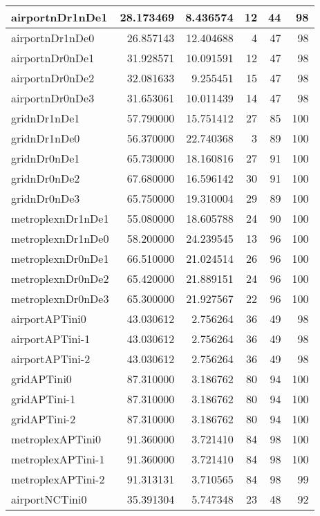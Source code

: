 \begin{longtable}{|l|r|r|r|r|r|}
\endlastfoot
airportnDr1nDe1 & 28.173469 & 8.436574 & 12 & 44 & 98 \\ \hline
airportnDr1nDe0 & 26.857143 & 12.404688 & 4 & 47 & 98 \\ \hline
airportnDr0nDe1 & 31.928571 & 10.091591 & 12 & 47 & 98 \\ \hline
airportnDr0nDe2 & 32.081633 & 9.255451 & 15 & 47 & 98 \\ \hline
airportnDr0nDe3 & 31.653061 & 10.011439 & 14 & 47 & 98 \\ \hline
gridnDr1nDe1 & 57.790000 & 15.751412 & 27 & 85 & 100 \\ \hline
gridnDr1nDe0 & 56.370000 & 22.740368 & 3 & 89 & 100 \\ \hline
gridnDr0nDe1 & 65.730000 & 18.160816 & 27 & 91 & 100 \\ \hline
gridnDr0nDe2 & 67.680000 & 16.596142 & 30 & 91 & 100 \\ \hline
gridnDr0nDe3 & 65.750000 & 19.310004 & 29 & 89 & 100 \\ \hline
metroplexnDr1nDe1 & 55.080000 & 18.605788 & 24 & 90 & 100 \\ \hline
metroplexnDr1nDe0 & 58.200000 & 24.239545 & 13 & 96 & 100 \\ \hline
metroplexnDr0nDe1 & 66.510000 & 21.024514 & 26 & 96 & 100 \\ \hline
metroplexnDr0nDe2 & 65.420000 & 21.889151 & 24 & 96 & 100 \\ \hline
metroplexnDr0nDe3 & 65.300000 & 21.927567 & 22 & 96 & 100 \\ \hline
airportAPTini0 & 43.030612 & 2.756264 & 36 & 49 & 98 \\ \hline
airportAPTini-1 & 43.030612 & 2.756264 & 36 & 49 & 98 \\ \hline
airportAPTini-2 & 43.030612 & 2.756264 & 36 & 49 & 98 \\ \hline
gridAPTini0 & 87.310000 & 3.186762 & 80 & 94 & 100 \\ \hline
gridAPTini-1 & 87.310000 & 3.186762 & 80 & 94 & 100 \\ \hline
gridAPTini-2 & 87.310000 & 3.186762 & 80 & 94 & 100 \\ \hline
metroplexAPTini0 & 91.360000 & 3.721410 & 84 & 98 & 100 \\ \hline
metroplexAPTini-1 & 91.360000 & 3.721410 & 84 & 98 & 100 \\ \hline
metroplexAPTini-2 & 91.313131 & 3.710565 & 84 & 98 & 99 \\ \hline
airportNCTini0 & 35.391304 & 5.747348 & 23 & 48 & 92 \\ \hline

\end{longtable}
